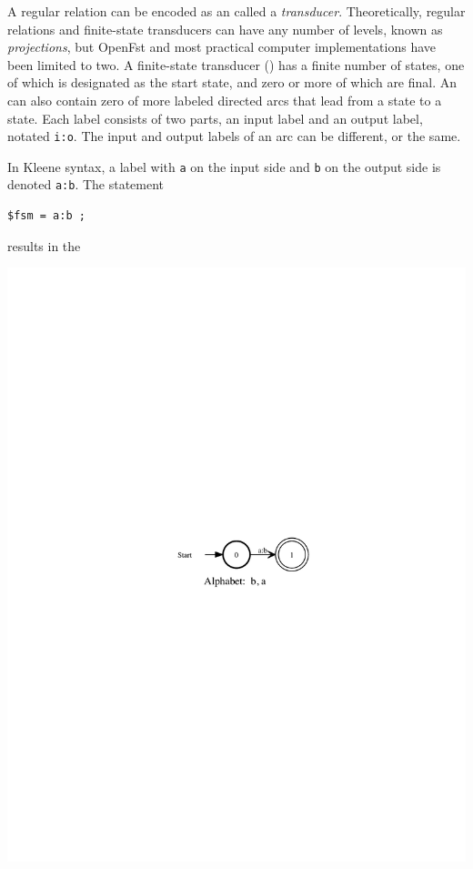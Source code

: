 A regular relation can be encoded as an \fsm{} called a \emph{transducer}.  Theoretically,
regular relations and finite-state transducers can have any number of levels, known as
\emph{projections}, but OpenFst and most practical computer implementations have been limited to two.
A finite-state transducer (\fst{}) has a finite number of states, one of which is
designated as the start state, and zero or more of which are final.  An \fst{} can also
contain zero of more labeled directed arcs that lead from a state to a state.  Each label
consists of two parts, an input label and an output label, notated  \verb!i:o!.  The input
and output labels of an arc can be different, or the same.

In Kleene syntax, a label with \texttt{a} on the input side and \texttt{b} on the output
side is denoted \texttt{a:b}.  The statement


\begin{Verbatim}
$fsm = a:b ;
\end{Verbatim}

\noindent
results in the \fst{}


\begin{center}
\includegraphics{images/aoverb.pdf}
\end{center}


